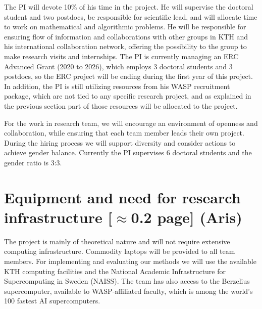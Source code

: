 \documentclass[a4paper,11pt]{article}
\begin{document}
The PI will devote 10\% of his time in the project. 
He will supervise the doctoral student and two postdocs, 
be responsible for scientific lead, 
and will allocate time to work on mathematical and algorithmic problems.
He will be responsible for ensuring flow of information and collaborations
with other groups in KTH and his international collaboration network, 
offering the possibility to the group to make research visits and internships.
The PI is currently managing an ERC Advanced Grant (2020 to 2026),
which employs 3 doctoral students and 3 postdocs, 
so the ERC project will be ending during the first year of this project. 
In addition, the PI is still utilizing resources from his WASP recruitment package, 
which are not tied to any specific research project, 
and as explained in the previous section part of those resources will be allocated to the {\acronym} project.

For the work in research team, 
we will encourage an environment of openness and collaboration, 
while ensuring that each team member leads their own project.
%
During the hiring process we will support diversity and consider actions to achieve gender balance. 
Currently the PI supervises 6 doctoral students and the gender ratio is 3:3.




\section{Equipment and need for research infrastructure {\color{orange}[$\approx$0.2 page]} {\color{teal}(Aris)}}


The project is mainly of theoretical nature and will not require extensive computing infrastructure. 
Commodity laptops will be provided to all team members. 
For implementing and evaluating our methods we will use the available 
KTH computing facilities
and the National Academic Infrastructure for Supercomputing in Sweden (NAISS).
The team has also access to the Berzelius supercomputer, 
available to WASP-affiliated faculty, 
which is among the world's 100 fastest AI supercomputers.
\end{document}
